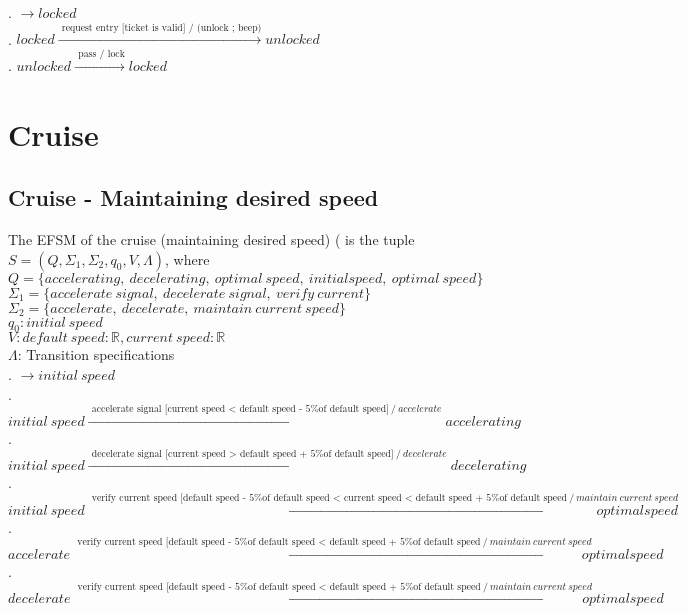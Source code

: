 \documentclass[12pt]{article}
\begin{document}
\begin{spacing}{1.5}
. $\rightarrow locked$\\
. $locked \xrightarrow {\text { request entry [ticket is valid] / (unlock ; beep)}} unlocked$\\
. $unlocked \xrightarrow {\text { pass / lock}} locked$\\

\newpage

\section{Cruise}
\subsection{Cruise - Maintaining desired speed}

\noindent The EFSM of the cruise (maintaining desired speed) ( is the tuple $S = (Q, \Sigma_1, \Sigma_2, q_0, V, \Lambda)$, where\\

\noindent $Q = \{accelerating,~decelerating,~optimal~speed,~initial speed,~optimal~speed\}$\\
\noindent $\Sigma_1 = \{accelerate~signal,~decelerate~signal,~ verify~current\}$\\
\noindent $\Sigma_2 = \{accelerate,~decelerate,~maintain~current~speed\}$\\
\noindent $q_0: initial~speed$\\
\noindent $V: default~speed: \mathbb R, current~speed: \mathbb R$\\
\noindent $\Lambda$: Transition specifications\\
. $\rightarrow initial~speed$\\
. $initial~speed \xrightarrow {\text { accelerate signal [current speed < default speed - 5\% of default speed]}~/ ~accelerate} accelerating$\\
. $initial~speed \xrightarrow {\text { decelerate signal [current speed > default speed + 5\% of default speed]}~/ ~decelerate} decelerating$\\
. $initial~speed \xrightarrow {\text { verify current speed [default speed - 5\% of default speed < current speed < default speed + 5\% of default speed}~/~maintain~current~speed} optimal speed$\\
. $accelerate \xrightarrow {\text { verify current speed [default speed - 5\% of default speed < default speed + 5\% of default speed}~/~maintain~current~speed} optimal speed$\\
. $decelerate \xrightarrow {\text { verify current speed [default speed - 5\% of default speed < default speed + 5\% of default speed}~/~maintain~current~speed} optimal speed$\\



\end{spacing}
\end{document}
